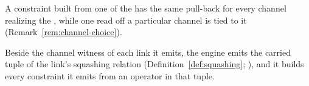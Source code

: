 
A constraint built from one of the  has the same
pull-back for every channel realizing the , while
one read off a particular channel is tied to it
(Remark~\ref{rem:channel-choice}).

\begin{requirement}\label{req:carried-tuple-emitted}
Beside the channel witness of each link it emits, the engine emits the
carried tuple of the link's squashing relation
(Definition~\ref{def:squashing}; ), and it
builds every constraint it emits from an operator in that tuple.
\end{requirement}
